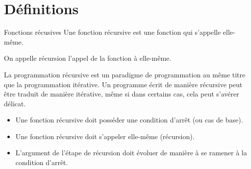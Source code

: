 \def\xxactivite{Cours}

\def\xxauteur{Xavier Pessoles}
\fichefalse \proftrue \tdfalse \courstrue

\def\xxnumchapitre{Chapitre 4 \vspace{.2cm}}
\def\xxchapitre{\hspace{.12cm} Récurisivité}

\def\xxcompetences{%
\textsl{%
\textbf{Savoirs et compétences :}\\
\begin{itemize}[label=\ding{112},font=\color{bleuxp}] 
\item Programmation récursive.
\end{itemize}
}}

\def\xxfigures{
}%


\setlength{\columnseprule}{.1pt}

\vspace{2cm}
\pagestyle{fancy}
\thispagestyle{plain}


\section{Définitions}
\begin{defi}{Fonctions récusives}
Une fonction récursive est une fonction qui s'appelle elle-même.

On appelle récursion l'appel de la fonction à elle-même.
\end{defi}

La programmation récursive est un paradigme de programmation au même titre que la programmation itérative. Un programme écrit de manière récursive peut être traduit de manière itérative, même si dans certains cas, cela peut s'avérer délicat.


\begin{methode}
\begin{itemize}
\item Une fonction récursive doit posséder une condition d'arrêt (ou cas de base).
\item Une fonction récursive doit s'appeler elle-même (récursion).
\item L'argument de l'étape de récursion doit évoluer de manière à se ramener à la condition d'arrêt.
\end{itemize}
\end{methode}
 
